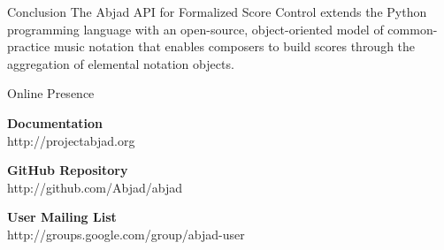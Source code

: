 \documentclass[10pt]{beamer}
\begin{document}
\begin{frame}{Conclusion}
The Abjad API for Formalized Score Control extends the Python programming
language with an open-source, object-oriented model of common-practice music
notation that enables composers to build scores through the aggregation of
elemental notation objects.
\end{frame}

\begin{frame}{Online Presence}

\textbf{Documentation} \\
http://projectabjad.org

\vfill{}

\textbf{GitHub Repository} \\
http://github.com/Abjad/abjad

\vfill{}

\textbf{User Mailing List} \\
http://groups.google.com/group/abjad-user

\end{frame}
\end{document}
